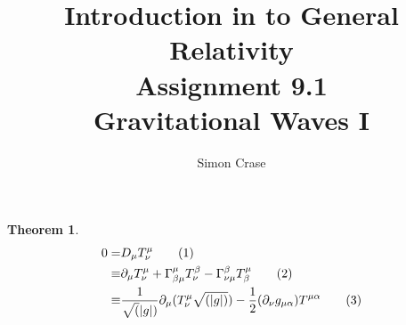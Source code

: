 \documentclass[]{article}
\title{Introduction in to General Relativity\\Assignment 9.1\\Gravitational Waves I}
\author{Simon Crase}
\newtheorem{theorem}{Theorem}
\newcommand\numberthis{\addtocounter{equation}{1}\tag{\theequation}}
\begin{document}
\maketitle


\begin{theorem}
	\begin{align*}
	0 =& D_{\mu} T^{\mu}_{\nu} \numberthis\label{eq:continuity} \\
	\equiv & \partial_{\mu} T^{\mu}_{\nu} + \Gamma^{\mu}_{\beta\mu}T^{\beta}_{\nu}-\Gamma^{\beta}_{\nu\mu}T^{\mu}_{\beta} \numberthis\label{eq:covariant-derivative}\\
	\equiv& \frac{1}{\sqrt(|g|)}\partial_{\mu}(T^{\mu}_{\nu}\sqrt{(|g|)}) - \frac{1}{2}(\partial_{\nu}g_{\mu\alpha})T^{\mu\alpha} \numberthis\label{eq:final}
	\end{align*}
\end{theorem}
\end{document}
